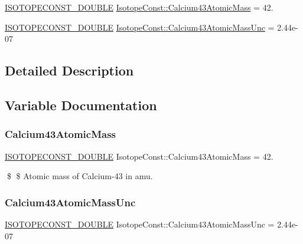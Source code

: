 \begin{DoxyCompactItemize}
\item 
\mbox{\hyperlink{group___isotope_const-_macros_ga8f45a7272ce02c0b4c65c44636ed719a}{I\+S\+O\+T\+O\+P\+E\+C\+O\+N\+S\+T\+\_\+\+D\+O\+U\+B\+LE}} \mbox{\hyperlink{group___isotope_const-_calcium-_ca43_ga930a8ffb7dd96b2cf3829ac61f624279}{Isotope\+Const\+::\+Calcium43\+Atomic\+Mass}} = 42.
\item 
\mbox{\hyperlink{group___isotope_const-_macros_ga8f45a7272ce02c0b4c65c44636ed719a}{I\+S\+O\+T\+O\+P\+E\+C\+O\+N\+S\+T\+\_\+\+D\+O\+U\+B\+LE}} \mbox{\hyperlink{group___isotope_const-_calcium-_ca43_gabcde744afff7fed34d484e26eaec45a5}{Isotope\+Const\+::\+Calcium43\+Atomic\+Mass\+Unc}} = 2.\+44e-\/07
\end{DoxyCompactItemize}


\subsection{Detailed Description}


\subsection{Variable Documentation}
\mbox{\label{group___isotope_const-_calcium-_ca43_ga930a8ffb7dd96b2cf3829ac61f624279}} 
\subsubsection{\texorpdfstring{Calcium43\+Atomic\+Mass}{Calcium43AtomicMass}}
{\footnotesize\ttfamily \mbox{\hyperlink{group___isotope_const-_macros_ga8f45a7272ce02c0b4c65c44636ed719a}{I\+S\+O\+T\+O\+P\+E\+C\+O\+N\+S\+T\+\_\+\+D\+O\+U\+B\+LE}} Isotope\+Const\+::\+Calcium43\+Atomic\+Mass = 42.}

\$ \$ Atomic mass of Calcium-\/43 in amu. \mbox{\label{group___isotope_const-_calcium-_ca43_gabcde744afff7fed34d484e26eaec45a5}} 
\subsubsection{\texorpdfstring{Calcium43\+Atomic\+Mass\+Unc}{Calcium43AtomicMassUnc}}
{\footnotesize\ttfamily \mbox{\hyperlink{group___isotope_const-_macros_ga8f45a7272ce02c0b4c65c44636ed719a}{I\+S\+O\+T\+O\+P\+E\+C\+O\+N\+S\+T\+\_\+\+D\+O\+U\+B\+LE}} Isotope\+Const\+::\+Calcium43\+Atomic\+Mass\+Unc = 2.\+44e-\/07}

